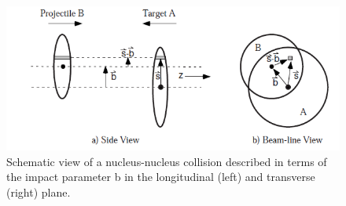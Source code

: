 \begin{itemize}
\end{itemize}


\begin{figure}[!b]
  \centering
  \includegraphics[width=12cm]{FigCap1/glauber.png}
  \caption{Schematic view of a nucleus-nucleus collision described in terms of the impact parameter b in the longitudinal (left) and transverse (right) plane.}
  \label{fig:image10}
\end{figure}

